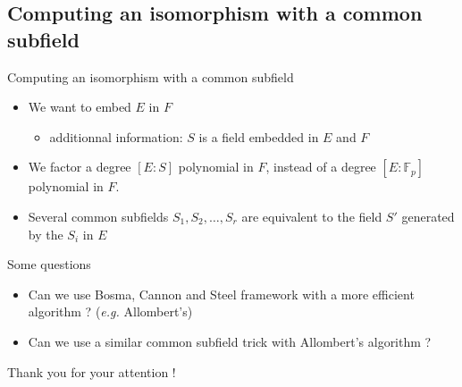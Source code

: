 \documentclass[xcolor=x11names,compress]{beamer}
\theoremstyle{break}
\theoremstyle{sc}
\theoremstyle{definition}
\theoremstyle{remark}
\newcommand{\eg}{\emph{e.g. }}
\begin{document}
\subsection{Computing an isomorphism with a common subfield}
\begin{frame}{Computing an isomorphism with a common subfield}
  \begin{itemize}
    \item We want to embed $E$ in $F$
      \begin{itemize}
        \item additionnal information: $S$ is a field embedded in $E$ and $F$
      \end{itemize}
   \item We factor a degree $[E:S]$ polynomial in $F$, instead of a degree
     $[E:\mathbb{F}_p]$ polynomial in $F$.
   \item Several common subfields $S_1, S_2, \dots, S_r$ are equivalent to the
     field $S'$ generated by the $S_i$ in $E$
  \end{itemize}
\end{frame}
\begin{frame}{Some questions}
  \begin{itemize}
    \item Can we use Bosma, Cannon and Steel framework with a more efficient
      algorithm ? (\eg Allombert's)
    \item Can we use a similar common subfield trick with Allombert's
      algorithm ?
  \end{itemize}
\end{frame}
\begin{frame}
  \begin{center}
    \huge{Thank you for your attention !}
  \end{center}
\end{frame}
\end{document}
